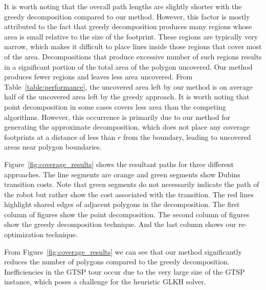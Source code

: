 \documentclass[../main.tex]{subfiles}
\begin{document}
It is worth noting that the overall path lengths are slightly shorter with the greedy decomposition compared to our method. However, this factor is mostly attributed to the fact that greedy decomposition produces many regions whose area is small relative to the size of the footprint. These regions are typically very narrow, which makes it difficult to place lines inside those regions that cover most of the area. Decompositions that produce excessive number of such regions results in a significant portion of the total area of the polygon uncovered. Our method produces fewer regions and leaves less area uncovered. From Table~\ref{table:performance}, the uncovered area left by our method is on average half of the uncovered area left by the greedy approach. It is worth noting that point decomposition in some cases covers less area than the competing algorithms. However, this occurrence is primarily due to our method for generating the approximate decomposition, which does not place any coverage footprints at a distance of less than $r$ from the boundary, leading to uncovered areas near polygon boundaries.

Figure~\ref{fig:coverage_results} shows the resultant paths for three different approaches. The line segments are orange and green segments show Dubins transition costs. Note that green segments do not necessarily indicate the path of the robot but rather show the cost associated with the transition. The red lines highlight shared edges of adjacent polygons in the decomposition. The first column of figures show the point decomposition. The second column of figures show the greedy decomposition technique. And the last column shows our re-optimization technique. 

From Figure~\ref{fig:coverage_results} we can see that our method significantly reduces the number of polygons compared to the greedy decomposition. Inefficiencies in the GTSP tour occur due to the very large size of the GTSP instance, which poses a challenge for the heuristic GLKH solver.
\end{document}
